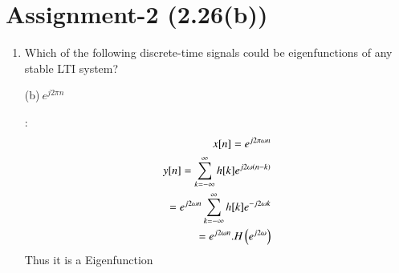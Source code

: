 \documentclass[journal,12pt,twocolumn]{IEEEtran}
\begin{document}
\section{Assignment-2 (2.26(b))}
\begin{enumerate}
	\item Which of the following discrete-time signals could be eigenfunctions of any stable LTI system?\\
	\begin{enumerate}
		(b)$\:e^{j2\pi n}$
	\end{enumerate}
	\solution:
	\begin{align}
		x[n]=e^{j2\pi\omega n}\\
		y[n]=\sum_{k=-\infty}^{\infty}h[k]e^{j2\omega\left(n-k\right)}\\
		=e^{j2\omega n}\sum_{k=-\infty}^{\infty}h[k]e^{-j2\omega k}\\
		=e^{j2\omega n}.H\left(e^{j2\omega}\right)
	\end{align}
	Thus it is a Eigenfunction
\end{enumerate}
\end{document}
